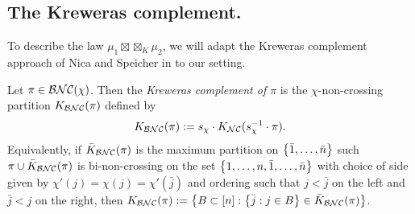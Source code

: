 
\subsection{The Kreweras complement.}
To describe the law $\mu_1\boxtimes\boxtimes_K\mu_2$, we will adapt the Kreweras complement approach of Nica and Speicher in \cite{nicaspeicher1997} to our setting.

\begin{definition}
	Let $\pi \in \mathcal{BNC}(\chi)$.
	Then the \emph{Kreweras complement of $\pi$} is the $\chi$-non-crossing partition $K_{\mathcal{BNC}}(\pi)$ defined by
	$$K_{\mathcal{BNC}}(\pi) := s_\chi \cdot K_{\mathcal{NC}}(s_\chi^{-1}\cdot \pi).$$
	Equivalently, if $\bar{K}_{\mathcal{BNC}}(\pi)$ is the maximum partition on $\left\{\bar1, \ldots, \bar n\right\}$ such $\pi \cup \bar{K}_{\mathcal{BNC}}(\pi)$ is bi-non-crossing on the set $\left\{1, \ldots, n, \bar1, \ldots,\bar n\right\}$ with choice of side given by $\chi'(j) = \chi(j) = \chi'(\bar{j})$ and ordering such that $j < \bar j$ on the left and $\bar j < j$ on the right, then $K_{\mathcal{BNC}}(\pi) := \left\{B \subset [n] : \left\{\bar{j} : j \in B\right\} \in \bar{K}_{\mathcal{BNC}}(\pi)\right\}$.
\end{definition}

